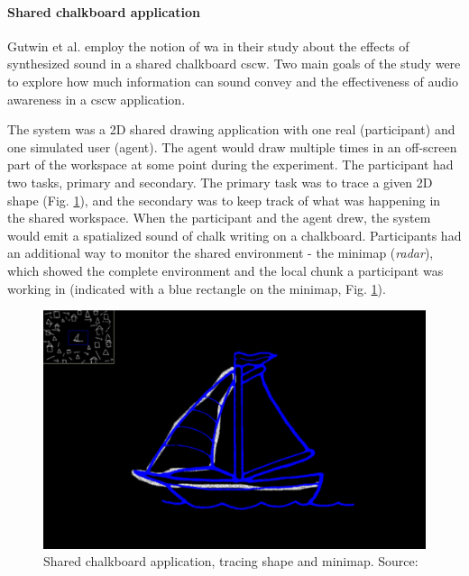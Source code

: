 \paragraph{Shared chalkboard application} 
\label{par:shared_chalkboard_application}
Gutwin et al. \parencite{gutwin_chalk_2011} employ the notion of \gls{wa} in their study about the effects of synthesized sound in a shared chalkboard \gls{cscw}.
Two main goals of the study were to explore how much information can sound convey and the effectiveness of audio awareness in a \gls{cscw} application.

The system was a 2D shared drawing application with one real (participant) and one simulated user (agent). The agent would draw multiple times in an off-screen part of the workspace at some point during the experiment. The participant had two tasks, primary and secondary. The primary task was to trace a given 2D shape (Fig. \ref{fig:gutwinchalk2011}), and the secondary was to keep track of what was happening in the shared workspace. When the participant and the agent drew, the system would emit a spatialized sound of chalk writing on a chalkboard. Participants had an additional way to monitor the shared environment -
the minimap (\textit{radar}), which showed the complete environment and the local chunk a participant was working in (indicated with a blue rectangle on the minimap, Fig. \ref{fig:gutwinchalk2011}).

\begin{figure}
	\centering
	\includegraphics[width=0.7\linewidth]{figures/gutwin_chalk_2011}
	\caption{Shared chalkboard application, tracing shape and minimap. Source: \parencite{gutwin_chalk_2011}}
	\label{fig:gutwinchalk2011}
\end{figure}


